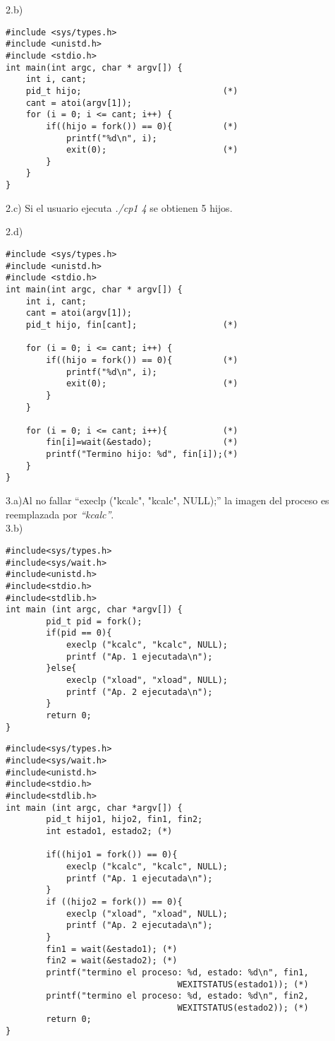 \documentclass{article}
\begin{document}
2.b)
\begin{verbatim}
#include <sys/types.h>
#include <unistd.h>
#include <stdio.h>
int main(int argc, char * argv[]) {
    int i, cant;
    pid_t hijo;                            (*)
    cant = atoi(argv[1]);
    for (i = 0; i <= cant; i++) {
        if((hijo = fork()) == 0){          (*)
            printf("%d\n", i);
            exit(0);                       (*)
        }
    }
}
\end{verbatim}

2.c) Si el usuario ejecuta \emph{./cp1 4} se obtienen 5 hijos.

2.d)
\begin{verbatim}
#include <sys/types.h>
#include <unistd.h>
#include <stdio.h>
int main(int argc, char * argv[]) {
    int i, cant;
    cant = atoi(argv[1]);
    pid_t hijo, fin[cant];                 (*)
    
    for (i = 0; i <= cant; i++) {
        if((hijo = fork()) == 0){          (*)
            printf("%d\n", i);
            exit(0);                       (*)
        }
    }
    
    for (i = 0; i <= cant; i++){           (*)
        fin[i]=wait(&estado);              (*)
        printf("Termino hijo: %d", fin[i]);(*)
    }
}
\end{verbatim}

3.a)Al no fallar ``execlp ("kcalc", "kcalc", NULL);''
la imagen del proceso es reemplazada por \emph{``kcalc''}.\\

3.b)
\begin{verbatim}
#include<sys/types.h>
#include<sys/wait.h>
#include<unistd.h>
#include<stdio.h>
#include<stdlib.h>
int main (int argc, char *argv[]) {
        pid_t pid = fork();
        if(pid == 0){
            execlp ("kcalc", "kcalc", NULL);
            printf ("Ap. 1 ejecutada\n");
        }else{
            execlp ("xload", "xload", NULL);
            printf ("Ap. 2 ejecutada\n");
        }
        return 0;
}
\end{verbatim}
\begin{verbatim}
#include<sys/types.h>
#include<sys/wait.h>
#include<unistd.h>
#include<stdio.h>
#include<stdlib.h>
int main (int argc, char *argv[]) {
        pid_t hijo1, hijo2, fin1, fin2;
        int estado1, estado2; (*)
        
        if((hijo1 = fork()) == 0){
            execlp ("kcalc", "kcalc", NULL);
            printf ("Ap. 1 ejecutada\n");
        }
        if ((hijo2 = fork()) == 0){
            execlp ("xload", "xload", NULL);
            printf ("Ap. 2 ejecutada\n");
        }
        fin1 = wait(&estado1); (*)
        fin2 = wait(&estado2); (*)
        printf("termino el proceso: %d, estado: %d\n", fin1, 
                                  WEXITSTATUS(estado1)); (*)
        printf("termino el proceso: %d, estado: %d\n", fin2,
                                  WEXITSTATUS(estado2)); (*)
        return 0;
}
\end{verbatim}
\end{document}
